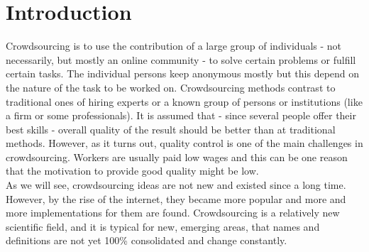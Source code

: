 \documentclass{acm_proc_article-sp}
\begin{document}
  \section{Introduction}
  \label{sect:intro}
  Crowdsourcing is to use the contribution of a large group of individuals - not necessarily, but mostly an online community - to solve certain problems or fulfill certain tasks. The individual persons keep anonymous mostly but this depend on the nature of the task to be worked on. Crowdsourcing methods contrast to traditional ones of hiring experts or a known group of persons or institutions (like a firm or some professionals). It is assumed that - since several people offer their best skills - overall quality of the result should be better than at traditional methods. However, as it turns out, quality control is one of the main challenges in crowdsourcing. Workers are usually paid low wages and this can be one reason that the motivation to provide good quality might be low. \\
  As we will see, crowdsourcing ideas are not new and existed since a long time. However, by the rise of the internet, they became more popular and more and more implementations for them are found. Crowdsourcing is a relatively new scientific field, and it is typical for new, emerging areas, that names and definitions are not yet 100\% consolidated and change constantly.
\end{document}
